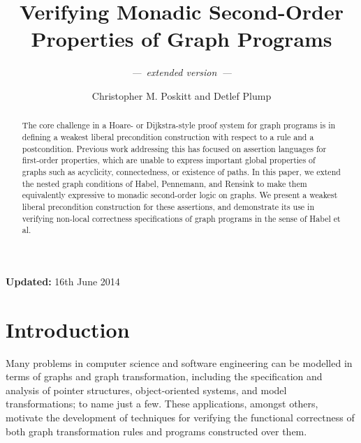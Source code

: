 \documentclass{llncs}
\begin{document}
	
	\title{Verifying Monadic Second-Order Properties of Graph Programs}
	\subtitle{\vspace{10pt}\emph{---\ extended version\ ---}}
	\author{Christopher M. Poskitt and Detlef Plump}


	

	\maketitle
	
	\begin{center}\textbf{Updated:} 16th June 2014\end{center}

	\begin{abstract}
		The core challenge in a Hoare- or Dijkstra-style proof system for graph programs is in defining a weakest liberal precondition construction with respect to a rule and a postcondition. Previous work addressing this has focused on assertion languages for first-order properties, which are unable to express important global properties of graphs such as acyclicity, connectedness, or existence of paths. In this paper, we extend the nested graph conditions of Habel, Pennemann, and Rensink to make them equivalently expressive to monadic second-order logic on graphs. We present a weakest liberal precondition construction for these assertions, and demonstrate its use in verifying non-local correctness specifications of graph programs in the sense of Habel et al.
	\end{abstract}
	
	
	\section{Introduction}
	
	Many problems in computer science and software engineering can be modelled in terms of graphs and graph transformation, including the specification and analysis of pointer structures, object-oriented systems, and model transformations; to name just a few. These applications, amongst others, motivate the development of techniques for verifying the functional correctness of both graph transformation rules and programs constructed over them.
	
\end{document}
